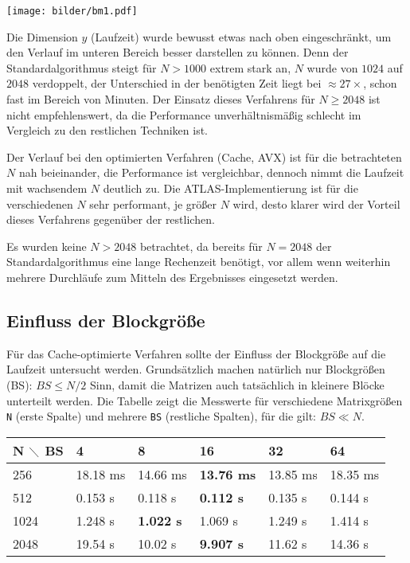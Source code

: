 \documentclass[a4paper,11pt]{scrartcl}
\begin{document}
\begin{center}
\texttt{[image: bilder/bm1.pdf]}
\end{center}

Die Dimension $y$ (Laufzeit) wurde bewusst etwas nach oben eingeschränkt, um den Verlauf
im unteren Bereich besser darstellen zu können. Denn der Standardalgorithmus 
steigt für $N>1000$ extrem stark an, $N$ wurde von $1024$ auf $2048$ verdoppelt, 
der Unterschied in der benötigten Zeit liegt bei $\approx 27\times$, schon fast im Bereich von
Minuten. Der Einsatz dieses
Verfahrens für $N \geq 2048 $ ist nicht empfehlenswert, da die Performance un­ver­hält­nis­mä­ßig schlecht im Vergleich zu den restlichen Techniken ist.\newline

Der Verlauf bei den optimierten Verfahren (Cache, AVX) ist für die betrachteten $N$ nah beieinander,
die Performance ist vergleichbar, dennoch nimmt die Laufzeit mit wachsendem $N$ deutlich zu.
Die ATLAS-Implementierung ist für die verschiedenen $N$ sehr performant, je größer $N$ wird, desto
klarer wird der Vorteil dieses Verfahrens gegenüber der restlichen.\newline

Es wurden keine $N>2048$ betrachtet, da bereits für $N=2048$
der Standardalgorithmus eine lange Rechenzeit benötigt, vor allem wenn weiterhin mehrere
Durchläufe zum Mitteln des Ergebnisses eingesetzt werden.


\subsection{Einfluss der Blockgröße}\label{chp:BS}
Für das Cache-optimierte Verfahren sollte der Einfluss der Blockgröße auf die Laufzeit
untersucht werden. Grundsätzlich machen natürlich nur Blockgrößen (BS): $BS \leq N/2$
Sinn, damit die Matrizen auch tatsächlich in kleinere Blöcke unterteilt werden.
Die Tabelle zeigt die Messwerte für verschiedene Matrixgrößen \texttt{N} (erste Spalte)
und mehrere \texttt{BS} (restliche Spalten), für die gilt: $BS \ll N$.

\begin{center}
\begin{tabular}{| l | l | l | l | l | l |}
\hline
N $\diagdown$ BS & 4 & 8 & 16 & 32 & 64  \\ \hline

256 & 18.18 ms & 14.66 ms & \textbf{13.76 ms} & 13.85 ms & 18.35 ms  \\ \hline
512 & 0.153 s & 0.118 s & \textbf{0.112 s} & 0.135 s & 0.144 s  \\ \hline
1024 & 1.248 s & \textbf{1.022 s} & 1.069 s & 1.249 s & 1.414 s  \\ \hline
2048 & 19.54 s & 10.02 s & \textbf{9.907 s} & 11.62 s & 14.36 s  \\ \hline
\end{tabular}
\end{center}
\end{document}
